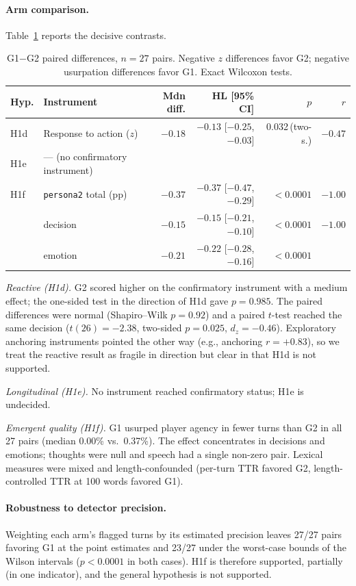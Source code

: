 \documentclass[11pt]{article}
\begin{document}
\paragraph{Arm comparison.} Table~\ref{tab:main} reports the decisive contrasts.
\begin{table}[t]\centering\small
\begin{tabular}{@{}llrrrr@{}}\toprule
Hyp. & Instrument & Mdn diff. & HL [95\% CI] & $p$ & $r$\\\midrule
H1d & Response to action ($z$) & $-0.18$ & $-0.13$ [$-0.25$, $-0.03$] & 0.032\,(two-s.) & $-0.47$\\
H1e & --- (no confirmatory instrument) & & & & \\
H1f & \texttt{persona2} total (pp) & $-0.37$ & $-0.37$ [$-0.47$, $-0.29$] & $<0.0001$ & $-1.00$\\
 & \quad decision & $-0.15$ & $-0.15$ [$-0.21$, $-0.10$] & $<0.0001$ & $-1.00$\\
 & \quad emotion & $-0.21$ & $-0.22$ [$-0.28$, $-0.16$] & $<0.0001$ & \\\bottomrule
\end{tabular}
\caption{G1$-$G2 paired differences, $n=27$ pairs. Negative $z$ differences favor G2; negative usurpation differences favor G1. Exact Wilcoxon tests.}\label{tab:main}
\end{table}

\emph{Reactive (H1d).} G2 scored higher on the confirmatory instrument with a medium effect; the one-sided test in the direction of H1d gave $p=0.985$. The paired differences were normal (Shapiro--Wilk $p=0.92$) and a paired $t$-test reached the same decision ($t(26)=-2.38$, two-sided $p=0.025$, $d_z=-0.46$). Exploratory anchoring instruments pointed the other way (e.g., anchoring $r=+0.83$), so we treat the reactive result as fragile in direction but clear in that H1d is not supported.

\emph{Longitudinal (H1e).} No instrument reached confirmatory status; H1e is undecided.

\emph{Emergent quality (H1f).} G1 usurped player agency in fewer turns than G2 in all 27 pairs (median 0.00\% vs.\ 0.37\%). The effect concentrates in decisions and emotions; thoughts were null and speech had a single non-zero pair. Lexical measures were mixed and length-confounded (per-turn TTR favored G2, length-controlled TTR at 100 words favored G1).

\paragraph{Robustness to detector precision.} Weighting each arm's flagged turns by its estimated precision leaves 27/27 pairs favoring G1 at the point estimates and 23/27 under the worst-case bounds of the Wilson intervals ($p<0.0001$ in both cases). H1f is therefore supported, partially (in one indicator), and the general hypothesis is not supported.
\end{document}
